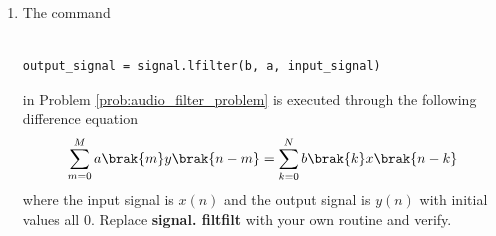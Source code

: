 \documentclass[journal,12pt,twocolumn]{IEEEtran}
\theoremstyle{remark}
\begin{document}
																																																																																	\begin{enumerate}[label=\thesection.\arabic*]
																																																																																	\item
																																																																																	The command
																																																																																	\begin{lstlisting}
																																																																																		output_signal = signal.lfilter(b, a, input_signal)
																																																																																			\end{lstlisting}
																																																																																			in Problem \ref{prob:audio_filter_problem} is executed through the following difference equation
																																																																																			\begin{equation}
																																																																																			\label{eq:iir_filter_gen}
																																																																																			 \sum _{m=0}^{M}a\brak{m}y\brak{n-m}=\sum _{k=0}^{N}b\brak{k}x\brak{n-k} 
																																																																																			 \end{equation}
																																																																																			 where the input signal is $x(n)$ and the output signal is $y(n)$ with initial values all 0. Replace
																																																																																			 \textbf{signal. filtfilt} with your own routine and verify.\\


\end{enumerate}
\end{document}
